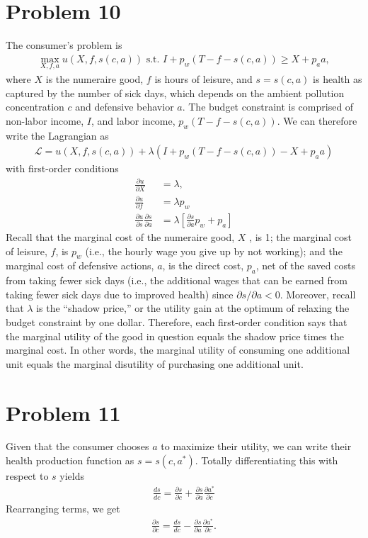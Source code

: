\documentclass[12pt]{article}
\begin{document}
\section*{Problem 10}
The consumer’s problem is
\begin{align*}
	\max_{X, f, a} u(X, f, s(c,a)) \text{ s.t. } I + p_w(T-f-s(c,a)) \geq X + p_a a,
\end{align*}
where $X$ is the numeraire good, $f$ is hours of leisure, and $s=s(c,a)$ is health as captured by the number of sick days, which depends on the ambient pollution concentration $c$ and defensive behavior $a$. The budget constraint is comprised of non-labor income, $I$, and labor income, $p_w(T-f-s(c,a))$. We can therefore write the Lagrangian as
\begin{align*}
	\mathcal{L} = u(X, f, s(c,a)) + \lambda(I + p_w(T-f-s(c,a)) - X + p_a a)
\end{align*}
with first-order conditions
\begin{align}
	\frac{\partial u}{\partial X} &= \lambda, \\
	\frac{\partial u}{\partial f} &= \lambda p_w \\
	\frac{\partial u}{\partial s} \frac{\partial s}{\partial a} &= \lambda \left[ \frac{\partial s}{\partial a} p_w + p_a  \right] \label{eqn:foc_a}
\end{align}
Recall that the marginal cost of the numeraire good, $X$ , is 1; the marginal cost of leisure, $f$, is $p_w$ (i.e., the hourly wage you give up by not working); and the marginal cost of defensive actions, $a$, is the direct cost, $p_a$, net of the saved costs from taking fewer sick days (i.e., the additional wages that can be earned from taking fewer sick days due to improved health) since $\partial s/\partial a < 0$. Moreover, recall that $\lambda$ is the ``shadow price,'' or the utility gain at the optimum of relaxing the budget constraint by one dollar. Therefore, each first-order condition says that the marginal utility of the good in question equals the shadow price times the marginal cost. In other words, the marginal utility of consuming one additional unit equals the marginal disutility of purchasing one additional unit.

\section*{Problem 11}
Given that the consumer chooses $a$ to maximize their utility, we can write their health production function as $s=s(c,a^*)$. Totally differentiating this with respect to $s$ yields
\begin{align*}
	\frac{ds}{dc} = \frac{\partial{s}}{{\partial c}} + \frac{\partial s}{\partial a} \frac{\partial a^*}{\partial c}
\end{align*}
Rearranging terms, we get 
\begin{align} \label{eqn_dsdc}
	\frac{\partial s}{\partial c} = \frac{ds}{dc} - \frac{\partial s}{\partial a} \frac{\partial a^*}{\partial c}.
\end{align}
\end{document}
